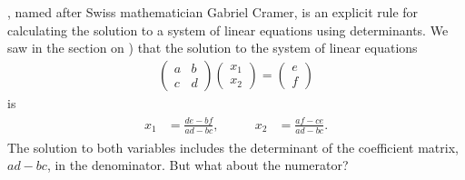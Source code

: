 \documentclass[letterpaper,10pt,english]{jupyterBook}
\begin{document}
\sphinxAtStartPar
{}, named after Swiss mathematician Gabriel Cramer, is an explicit rule for calculating the solution to a system of linear equations using determinants. We saw in the section on {\hyperref[\detokenize{_pages/2.0_Linear_systems:requirements-for-systems-of-linear-equations-to-be-solvable-section}]{}}) that the solution to the system of linear equations
\begin{equation*}
\begin{split} \begin{pmatrix} a & b \\ c & d \end{pmatrix}
    \begin{pmatrix} x_1 \\ x_2 \end{pmatrix} =
    \begin{pmatrix} e \\ f \end{pmatrix}\end{split}
\end{equation*}
\sphinxAtStartPar
is
\begin{equation*}
\begin{split} \begin{align*}
    x_1 &= \frac{de - bf}{ad - bc}, & \qquad
    x_2 &= \frac{af - ce}{ad - bc}.
\end{align*} \end{split}
\end{equation*}
\sphinxAtStartPar
The solution to both variables includes the determinant of the coefficient matrix, \(ad - bc\), in the denominator. But what about the numerator?
\end{document}
